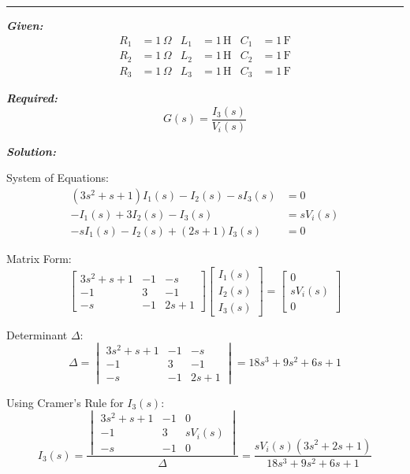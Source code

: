\documentclass[11pt]{article}
\begin{document}
\noindent\rule{\textwidth}{1pt}

\vspace{12pt}

\noindent\textbf{\textit{Given:}}
\[
\begin{aligned}
R_1 &= 1\, \Omega & L_1 &= 1\, \text{H} & C_1 &= 1\, \text{F} \\
R_2 &= 1\, \Omega & L_2 &= 1\, \text{H} & C_2 &= 1\, \text{F} \\
R_3 &= 1\, \Omega & L_3 &= 1\, \text{H} & C_3 &= 1\, \text{F}
\end{aligned}
\]

\vspace{12pt}

\noindent \textbf{\textit{Required:}}
\[
G(s) = \frac{I_3(s)}{V_i(s)}
\]

\vspace{12pt}

\noindent \textbf{\textit{Solution:}}

\bigskip

{System of Equations:}
\[
\begin{aligned}
(3s^2 + s + 1)I_1(s) - I_2(s) - s I_3(s) &= 0 \\
-I_1(s) + 3I_2(s) - I_3(s) &= sV_i(s) \\
-s I_1(s) - I_2(s) + (2s + 1)I_3(s) &= 0
\end{aligned}
\]

{Matrix Form:}
\[
\begin{bmatrix}
3s^2 + s + 1 & -1 & -s \\
-1 & 3 & -1 \\
-s & -1 & 2s + 1
\end{bmatrix}
\begin{bmatrix}
I_1(s) \\ I_2(s) \\ I_3(s)
\end{bmatrix}
=
\begin{bmatrix}
0 \\ sV_i(s) \\ 0
\end{bmatrix}
\]

{Determinant \(\Delta\):}
\[
\Delta =
\begin{vmatrix}
3s^2 + s + 1 & -1 & -s \\
-1 & 3 & -1 \\
-s & -1 & 2s + 1
\end{vmatrix}
= 18s^3 + 9s^2 + 6s + 1
\]

{Using Cramer's Rule for \(I_3(s)\):}
\[
I_3(s) =
\frac{
\begin{vmatrix}
3s^2 + s + 1 & -1 & 0 \\
-1 & 3 & sV_i(s) \\
-s & -1 & 0
\end{vmatrix}
}
{\Delta}
= \frac{sV_i(s)(3s^2 + 2s + 1)}{18s^3 + 9s^2 + 6s + 1}
\]
\end{document}
